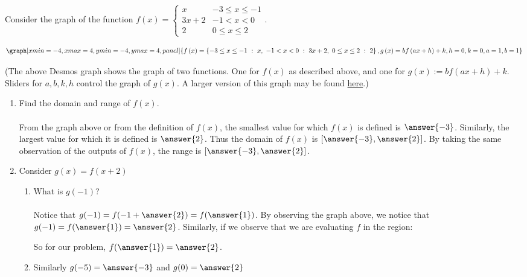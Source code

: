 \documentclass{ximera}
\begin{document}
\begin{question}
Consider the graph of the function $f(x)=\begin{cases}   x & -3\leq x \leq -1 \\ 3x+2 &-1<x<0 \\ 2 & 0\leq x\leq 2\end{cases}.$

 \begin{onlineOnly}
   \[
   \graph[xmin=-4,xmax=4,ymin=-4,ymax=4, panel]{f\left(x\right)=\left\{-3\le x\le -1\ :\ x,\ -1<x<0\ :\ 3x+2,\ 0\le x\le 2\ :\ 2\right\}, g\left(x\right)=bf\left(ax+h\right)+k, h=0,k=0,a=1,b=1} 
   \]
 \end{onlineOnly}
(The above Desmos graph shows the graph of two functions.  One for $f(x)$ as described above, and one for $g(x):=bf(ax+h)+k$.  Sliders for $a,b,k,h$ control the graph of $g(x)$.  A larger version of this graph may be found \href{https://www.desmos.com/calculator/zmsp6bcsiq}{here}.)


\begin{enumerate}
\item Find the domain and range of $f(x)$.\\ \\ From the graph above or from the definition of $f(x)$, the smallest value for which $f(x)$ is defined is $\answer{-3}$.  Similarly, the largest value for which it is defined is $\answer{2}$.  Thus the domain of $f(x)$ is $[\answer{-3}, \answer{2}]$.  By taking the same observation of the outputs of $f(x)$, the range is $[\answer{-3}, \answer{2}]$.

\item Consider $g(x)=f(x+2)$
\begin{enumerate}
\item What is $g(-1)$?  \\ \\ Notice that $g(-1)=f(-1+\answer{2})=f(\answer{1})$.  By observing the graph above, we notice that $g(-1)=f(\answer{1})=\answer{2}$.  Similarly, if we observe that we are evaluating $f$ in the region:

\begin{multipleChoice}
\end{multipleChoice}

So for our problem, $f(\answer{1})=\answer{2}$.

\item Similarly $g(-5)=\answer{-3}$ and $g(0)=\answer{2}$


\end{enumerate}
\end{enumerate}
\end{question}
\end{document}
